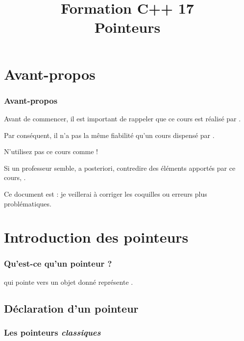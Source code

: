 \documentclass{cppcourses}
\title[Formation C++ 17]{
    Formation C++ 17 \no 03 \\
    \small{Pointeurs}
}
\begin{document}
\frame{\titlepage}

\section{Avant-propos}

\begin{frame}

\frametitle{Avant-propos}

Avant de commencer, il est important de rappeler que ce cours est réalisé par .

Par conséquent, il n'a pas la même fiabilité qu'un cours dispensé par .

N'utilisez pas ce cours comme  !

Si un professeur semble, a posteriori, contredire des éléments apportés par ce cours, .

Ce document est  : je veillerai à corriger les coquilles ou erreurs plus problématiques.

\end{frame}

\section{Introduction des pointeurs}

\begin{frame}

\frametitle{Qu'est-ce qu'un pointeur ?}

\begin{definition}
 qui pointe vers un objet donné représente .
\end{definition}

\end{frame}

\subsection{Déclaration d'un pointeur}

\subsubsection{Les pointeurs \emph{classiques}}
\end{document}
